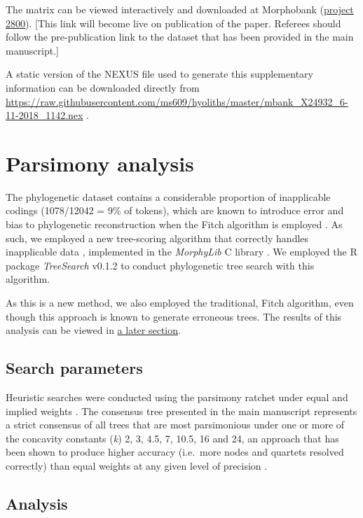 \documentclass[openany]{book}
\theoremstyle{definition}
\theoremstyle{definition}
\theoremstyle{definition}
\theoremstyle{remark}
\begin{document}
The matrix can be viewed interactively and downloaded at Morphobank
(\href{https://morphobank.org/permalink/?P2800}{project 2800}). {[}This
link will become live on publication of the paper. Referees should
follow the pre-publication link to the dataset that has been provided in
the main manuscript.{]}

A static version of the NEXUS file used to generate this supplementary
information can be downloaded directly from
\url{https://raw.githubusercontent.com/ms609/hyoliths/master/mbank_X24932_6-11-2018_1142.nex}
.

\hypertarget{treesearch}{\chapter{Parsimony analysis}\label{treesearch}}

The phylogenetic dataset contains a considerable proportion of
inapplicable codings (1078/12042 = 9\% of tokens), which are known to
introduce error and bias to phylogenetic reconstruction when the Fitch
algorithm is employed \citep{Maddison1993, Brazeau2018}. As such, we
employed a new tree-scoring algorithm that correctly handles
inapplicable data \citep{Brazeau2018}, implemented in the
\emph{MorphyLib} C library \citep{Brazeau2017Morphylib}. We employed the
R package \emph{TreeSearch} v0.1.2 \citep{Smith2018TreeSearch} to
conduct phylogenetic tree search with this algorithm.

As this is a new method, we also employed the traditional, Fitch
algorithm, even though this approach is known to generate erroneous
trees. The results of this analysis can be viewed in
\protect\hyperlink{fitch}{a later section}.

\section{Search parameters}\label{search-parameters}

Heuristic searches were conducted using the parsimony ratchet
\citep{Nixon1999} under equal and implied weights \citep{Goloboff1997}.
The consensus tree presented in the main manuscript represents a strict
consensus of all trees that are most parsimonious under one or more of
the concavity constants (\emph{k}) 2, 3, 4.5, 7, 10.5, 16 and 24, an
approach that has been shown to produce higher accuracy (i.e.~more nodes
and quartets resolved correctly) than equal weights at any given level
of precision \citep{Smith2017}.

\section{Analysis}\label{analysis}
\end{document}
